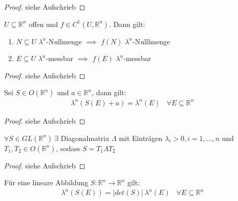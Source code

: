 \documentclass[11pt,a4paper,fleqn,openany]{report}
\begin{document}
    \begin{proof}
      siehe Aufschrieb
    \end{proof}

    \begin{theorem}
      $U \subseteq \mathbb{R}^n$ offen und $f \in C^1(U, \mathbb{R}^n)$. Dann gilt:
      \begin{enumerate}
        \item $N \subseteq U$ $\lambda^n$-Nullmenge $\implies$ $f(N)$ $\lambda^n$-Nulllmenge
        \item $E \subseteq U$ $\lambda^n$-messbar $\implies$ $f(E)$ $\lambda^n$-messbar
      \end{enumerate}
    \end{theorem}

    \begin{proof}
      siehe Aufschrieb
    \end{proof}

    \begin{theorem}
      Sei $S \in O(\mathbb{R}^n)$ und $a \in \mathbb{R}^n$, dann gilt:
      \begin{align*}
        \lambda^n(S(E) + a) = \lambda^n(E) \ \ \ \ \forall E \subseteq \mathbb{R}^n
      \end{align*}
    \end{theorem}

    \begin{proof}
      siehe Aufschrieb
    \end{proof}

    \begin{lemma}[Polarzerlegung]
      $\forall S \in GL(\mathbb{R}^n) \ \exists$ Diagonalmatrix $\Lambda$ mit Einträgen $\lambda_i > 0, i=1,...,n$ und \\
      $T_1, T_2 \in O(\mathbb{R}^n)$, sodass $S = T_1 \Lambda T_2$ 
    \end{lemma}

    \begin{proof}
      siehe Aufschrieb
    \end{proof}

    \begin{theorem}
      Für eine lineare Abbildung $S: \mathbb{R}^n \to \mathbb{R}^n$ gilt:
      \begin{align*}
        \lambda^n(S(E)) = |det(S)| \ \lambda^n(E) \ \ \ \ \forall E \subseteq \mathbb{R}^n
      \end{align*}
    \end{theorem}
\end{document}
